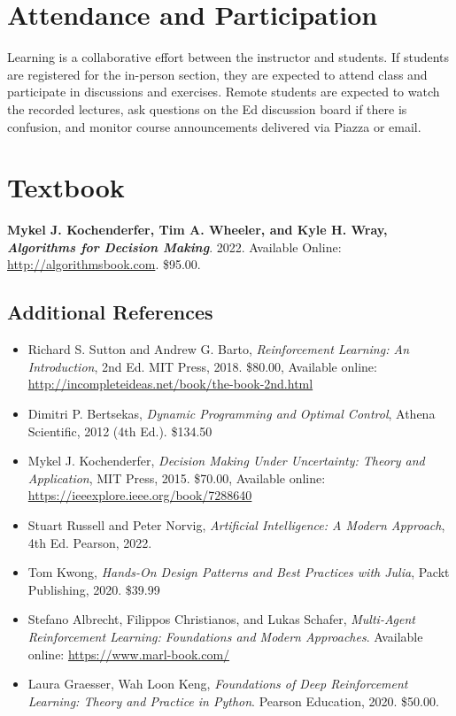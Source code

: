 \documentclass[9pt]{article}
\begin{document}
\section*{Attendance and Participation}

Learning is a collaborative effort between the instructor and students. If students are registered for the in-person section, they are expected to attend class and participate in discussions and exercises. Remote students are expected to watch the recorded lectures, ask questions on the Ed discussion board if there is confusion, and monitor course announcements delivered via Piazza or email.

\section*{Textbook}

\textbf{Mykel J. Kochenderfer, Tim A. Wheeler, and Kyle H. Wray, \textit{Algorithms for Decision Making}}. 2022. Available Online: \url{http://algorithmsbook.com}. \$95.00.

\subsection*{Additional References}

\begin{itemize}[noitemsep]
    \item Richard S. Sutton and Andrew G. Barto, \textit{Reinforcement Learning: An Introduction}, 2nd Ed. MIT Press, 2018. \$80.00, Available online: \url{http://incompleteideas.net/book/the-book-2nd.html}
    \item Dimitri P. Bertsekas, \textit{Dynamic Programming and Optimal Control}, Athena Scientific, 2012 (4th Ed.). \$134.50
    \item Mykel J. Kochenderfer, \textit{Decision Making Under Uncertainty: Theory and Application}, MIT Press, 2015. \$70.00, Available online: \url{https://ieeexplore.ieee.org/book/7288640}
    \item Stuart Russell and Peter Norvig, \textit{Artificial Intelligence: A Modern Approach}, 4th Ed. Pearson, 2022.
    \item Tom Kwong, \textit{Hands-On Design Patterns and Best Practices with Julia}, Packt Publishing, 2020. \$39.99
    \item Stefano Albrecht, Filippos Christianos, and Lukas Schafer, \textit{Multi-Agent Reinforcement Learning: Foundations and Modern Approaches}. Available online: \url{https://www.marl-book.com/}
    \item Laura Graesser, Wah Loon Keng, \textit{Foundations of Deep Reinforcement Learning: Theory and Practice in Python}. Pearson Education, 2020. \$50.00.
\end{itemize}
\end{document}
